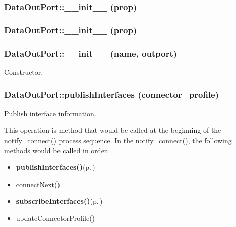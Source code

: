 \subsubsection{\setlength{\rightskip}{0pt plus 5cm}Data\-Out\-Port::\_\-\_\-init\_\-\_\- (prop)}\label{classDataOutPort_DataOutPorta7}


\subsubsection{\setlength{\rightskip}{0pt plus 5cm}Data\-Out\-Port::\_\-\_\-init\_\-\_\- (prop)}\label{classDataOutPort_DataOutPorta5}


\subsubsection{\setlength{\rightskip}{0pt plus 5cm}Data\-Out\-Port::\_\-\_\-init\_\-\_\- (name, outport)}\label{classDataOutPort_DataOutPorta0}


Constructor. 

\subsubsection{\setlength{\rightskip}{0pt plus 5cm}Data\-Out\-Port::publish\-Interfaces (connector\_\-profile)}\label{classDataOutPort_DataOutPorta2}


Publish interface information. 

This operation is method that would be called at the beginning of the notify\_\-connect() process sequence. In the notify\_\-connect(), the following methods would be called in order.

\begin{itemize}
\item {\bf publish\-Interfaces()}{\rm (p.\,\pageref{classDataOutPort_DataOutPorta2})}\item connect\-Next()\item {\bf subscribe\-Interfaces()}{\rm (p.\,\pageref{classDataOutPort_DataOutPorta3})}\item update\-Connector\-Profile()\end{itemize}


